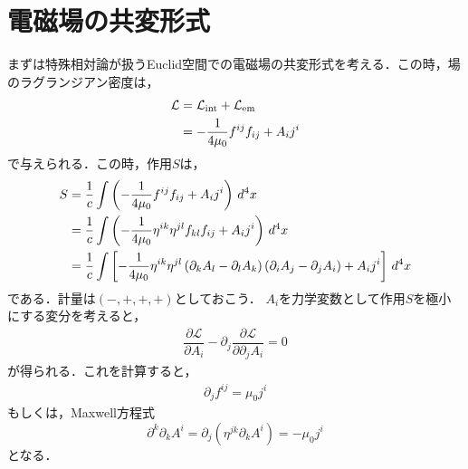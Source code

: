 \documentclass[a4paper]{ltjsreport}
\begin{document}
\section{電磁場の共変形式}
まずは特殊相対論が扱うEuclid空間での電磁場の共変形式を考える．この時，場のラグランジアン密度は，
\begin{align}
  \mathcal{L} &= \mathcal{L}_\text{int} + \mathcal{L}_\text{em}\notag\\
  &=  - \dfrac{1}{4\mu_0}f^{ij}f_{ij} + A_ij^i\label{spc_L}
\end{align}
で与えられる．この時，作用$S$は，
\begin{align}
  S &= \dfrac{1}{c}\int\left( - \dfrac{1}{4\mu_0}f^{ij}f_{ij} + A_ij^i\right)\,d^4x\notag\\
  &= \dfrac{1}{c}\int\left( - \dfrac{1}{4\mu_0}\eta^{ik}\eta^{jl}f_{kl}f_{ij} + A_ij^i\right)\,d^4x\notag\\
  &= \dfrac{1}{c}\int\left[ - \dfrac{1}{4\mu_0}\eta^{ik}\eta^{jl}\left(\partial_kA_l - \partial_lA_k\right)\left(\partial_iA_j - \partial_jA_i\right) + A_ij^i\right]\,d^4x
\end{align}
である．計量は$( - , + , + , + )$としておこう．
$A_i$を力学変数として作用$S$を極小にする変分を考えると，
\begin{align}
  \dfrac{\partial{\mathcal{L}}}{\partial{}A_i} - \partial_j\dfrac{\partial{\mathcal{L}}}{\partial\partial_jA_i}=0
\end{align}
が得られる．これを計算すると，
\begin{align}
  \partial_jf^{ij}=\mu_0j^i \label{spc_Maxwell}
\end{align}
もしくは，Maxwell方程式
\[ \partial^k\partial_kA^i = \partial_j\left(\eta^{jk}\partial_kA^i\right) =  - \mu_0j^i \]
となる．
\end{document}

